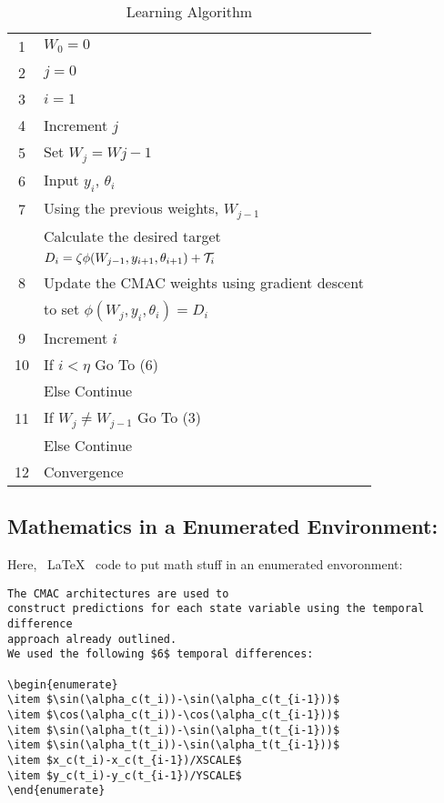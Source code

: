 \documentclass[11pt]{SelfArxOneColBMN}
\begin{document}
\begin{table}[hhh]
\caption{Learning Algorithm}
\begin{center}
\begin{tabular}{cl} \\
1 & $W_0 = 0$\\
2 & $j=0$\\
3 & $i=1$\\
4 &  Increment $j$\\
5 &  Set $W_j = W{j-1}$ \\
6 & Input $y_i$, $\theta_i$ \\
7 & Using the previous weights, $W_{j-1}$\\
  & Calculate the desired target\\ 
  & $D_i = \zeta {\phi}(W_{j-1},y_{i+1},\theta_{i+1})
          +{\cal T}_{i}$\\
8 &  Update the CMAC weights using gradient descent\\
  &  to set ${\phi}(W_{j},y_i,\theta_i) = D_i$\\
9 & Increment $i$\\
10 & If $i< \eta$ Go To (6)\\
   &   Else Continue\\
11 & If $W_j \neq W_{j-1}$ Go To (3)\\
   &  Else Continue\\
12 & Convergence\\
\end{tabular}
\end{center}
\label{criticlearn}
\end{table}

\subsection{Mathematics in a Enumerated Environment:}

Here, ~\LaTeX~ code to put math stuff in an enumerated envoronment:

\singlespacing 
{}
\begin{lstlisting}
The CMAC architectures are used to 
construct predictions for each state variable using the temporal difference
approach already outlined. 
We used the following $6$ temporal differences:

\begin{enumerate}
\item $\sin(\alpha_c(t_i))-\sin(\alpha_c(t_{i-1}))$
\item $\cos(\alpha_c(t_i))-\cos(\alpha_c(t_{i-1}))$
\item $\sin(\alpha_t(t_i))-\sin(\alpha_t(t_{i-1}))$
\item $\sin(\alpha_t(t_i))-\sin(\alpha_t(t_{i-1}))$
\item $x_c(t_i)-x_c(t_{i-1})/XSCALE$
\item $y_c(t_i)-y_c(t_{i-1})/YSCALE$
\end{enumerate}
\end{lstlisting}
\onehalfspacing
\lstset{fancyvrb=false}
\end{document}
